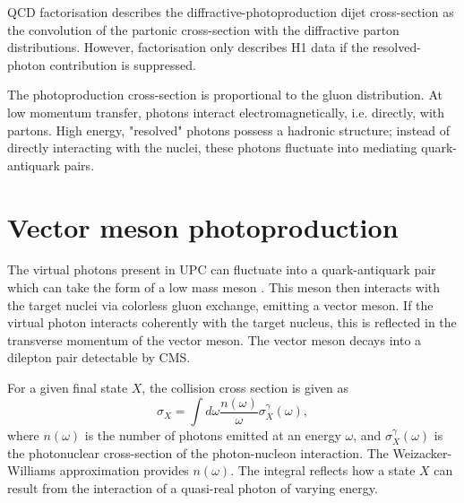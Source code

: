 QCD factorisation describes the diffractive-photoproduction dijet cross-section as the convolution of the partonic cross-section with the diffractive parton distributions. However, factorisation only describes H1 data if the resolved-photon contribution is suppressed. 

The photoproduction cross-section is proportional to the gluon distribution. At low momentum transfer, photons interact electromagnetically, i.e. directly, with partons. High energy, "resolved" photons possess a hadronic structure; instead of directly interacting with the nuclei, these photons fluctuate into mediating quark-antiquark pairs. 

\section{Vector meson photoproduction}

The virtual photons present in UPC can fluctuate into a quark-antiquark pair which can take the form of a low mass meson \cite{lta2011.09}. This meson then interacts with the target nuclei via colorless gluon exchange, emitting a vector meson. If the virtual photon interacts coherently with the target nucleus, this is reflected in the transverse momentum of the vector meson. The vector meson decays into a dilepton pair detectable by CMS. 

For a given final state $X$, the collision cross section is given as
\begin{equation}
\sigma_X = \int d \omega \frac{n(\omega)}{\omega} \sigma_X^\gamma(\omega),
\end{equation}
where $n(\omega)$ is the number of photons emitted at an energy $\omega$, and $\sigma_X^\gamma(\omega)$ is the photonuclear cross-section of the photon-nucleon interaction. The Weizacker-Williams approximation provides $n(\omega)$. The integral reflects how a state $X$ can result from the interaction of a quasi-real photon of varying energy. 

